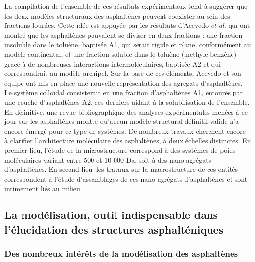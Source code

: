 La compilation de l'ensemble de ces résultats expérimentaux tend à suggérer que les deux modèles structuraux des asphaltènes peuvent coexister au sein des fractions lourdes. Cette idée est appuyée par les résultats d'Acevedo \textit{et al.} \cite{acevedo2004structural, gutierrez2001fractionation} qui ont montré que les asphaltènes pouvaient se diviser en deux fractions : une fraction insoluble dans le toluène, baptisée A1, qui serait rigide et plane, conformément au modèle continental, et une fraction soluble dans le toluène (methyle-benzène) grace à de nombreuses interactions intermoléculaires, baptisée A2 et qui correspondrait au modèle archipel. Sur la base de ces éléments, Acevedo et son équipe ont mis en place une nouvelle représentation des agrégats d'asphaltènes. Le système colloïdal consisterait en une fraction d'asphaltènes A1, entourés par une couche d'asphaltènes A2, ces derniers aidant à la solubilisation de l'ensemble. \\
En définitive, une revue bibliographique des analyses expérimentales menées à ce jour sur les asphaltènes montre qu'aucun modèle structural définitif valide n'a encore émergé pour ce type de systèmes. De nombreux travaux cherchent encore à clarifier l'architecture moléculaire des asphaltènes, à deux échelles distinctes. En premier lieu, l'étude de la microstructure correspond à des systèmes de poids moléculaires variant entre 500 et 10 000 Da, soit à des nano-agrégats d'asphaltènes. En second lieu, les travaux sur la macrostructure de ces entités correspondent à l'étude d'assemblages de ces nano-agrégats d'asphaltènes et sont intimement liés au milieu. 



\subsection{La modélisation, outil indispensable dans l'élucidation des structures asphalténiques}

\subsubsection{Des nombreux intérêts de la modélisation des asphaltènes}


